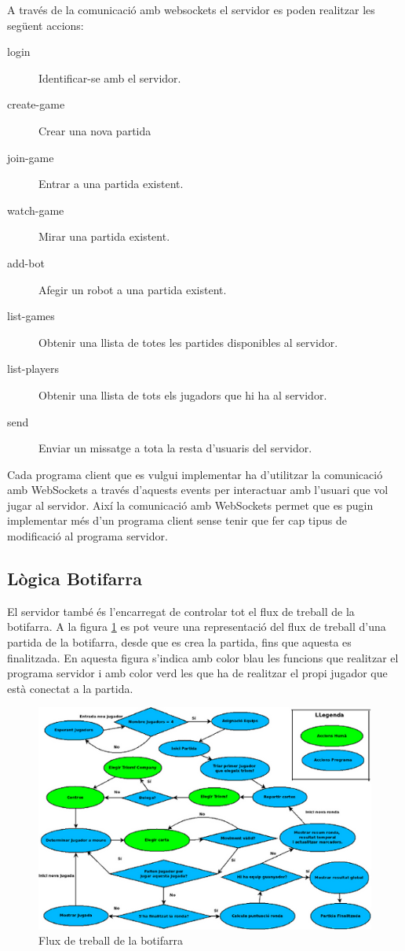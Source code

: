 A través de la comunicació amb websockets el servidor es poden realitzar les següent accions: 

\begin{description}
\item[login] {Identificar-se amb el servidor.}
\item[create-game] {Crear una nova partida}
\item[join-game] {Entrar a una partida existent.}
\item[watch-game] {Mirar una partida existent.}
\item[add-bot] {Afegir un robot a una partida existent.}
\item[list-games] {Obtenir una llista de totes les partides disponibles al servidor.}
\item[list-players] {Obtenir una llista de tots els jugadors que hi ha al servidor.}
\item[send] {Enviar un missatge a tota la resta d'usuaris del servidor. }
\end{description}

Cada programa client que es vulgui implementar ha d'utilitzar la comunicació amb WebSockets a través d'aquests events per interactuar amb l'usuari que vol jugar al servidor. Així la comunicació amb WebSockets permet que es pugin implementar més d'un programa client sense tenir que fer cap tipus de modificació al programa servidor. 

\subsection{Lògica Botifarra}

El servidor també és l'encarregat de controlar tot el flux de treball de la botifarra. A la figura \ref{fig:buti-workflow} es pot veure una representació del flux de treball d'una partida de la botifarra, desde que es crea la partida, fins que aquesta es finalitzada. En aquesta figura s'indica amb color blau les funcions que realitzar el programa servidor i amb color verd les que ha de realitzar el propi jugador que està conectat a la partida. 

\begin{figure}[htbp]
\hspace*{-1.5in}
\centering\includegraphics{img/butifarra_workflow.png}
\caption{Flux de treball de la botifarra}
\label{fig:buti-workflow}
\end{figure} 

